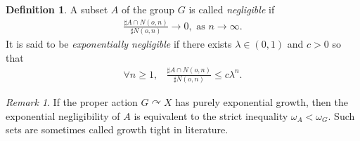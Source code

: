 \documentclass{amsart}
\theoremstyle{definition}
\newtheorem{defn}[thm]{Definition}
\theoremstyle{remark}
\newtheorem*{rem}{Remark}
\newcommand{\act}{\curvearrowright}
\newcommand{\e}[1]{\omega_{#1}}
\begin{document}
\begin{defn}
A subset $A$ of the group $G$ is called \textit{negligible} if 
$$\begin{aligned}
\frac{\sharp A\cap  N(o,n)}{\sharp N(o,n)} \to 0, \text{ as } n\to\infty.   
\end{aligned}$$
It is said to be \textit{exponentially negligible} if there exists $\lambda\in (0,1)$ and $c>0$ so that 
$$\begin{aligned}
\forall n\ge 1,\;\;\; \frac{\sharp A\cap  N(o,n)}{\sharp N(o,n)} \le c\lambda^n.   
\end{aligned}$$
\end{defn}
\begin{rem}
If the proper action $G\act X$ has {purely exponential growth}, then the exponential negligibility of $A$ is equivalent to the strict inequality $\e A<\e G$. Such sets are sometimes called growth tight in literature.    
\end{rem}
\end{document}
